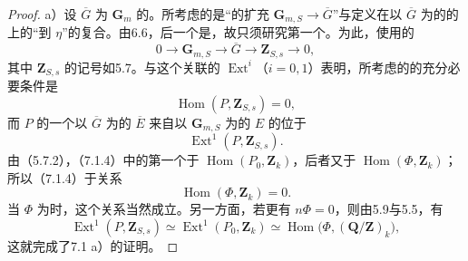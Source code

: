 \begin{proof}
 a）设 $\overline G$ 为 $\mathbf G_m$ 的。所考虑的是“的扩充 $\mathbf G_{m,S}\to\overline G$”与定义在以 $\overline G$ 为的的上的“到 $\eta$”的复合。由6.6，后一个是，故只须研究第一个。为此，使用的
\[
0\longrightarrow\mathbf G_{m,S}\longrightarrow\overline G\longrightarrow\mathbf Z_{S,s}\longrightarrow0,\tag{7.1.3}
\]
其中 $\mathbf Z_{S,s}$ 的记号如5.7。与这个关联的 $\operatorname{Ext}^i$（$i=0,1$）表明，所考虑的的充分必要条件是
\[
\operatorname{Hom}(P,\mathbf Z_{S,s})=0,\tag{7.1.4}
\]
而 $P$ 的一个以 $\overline G$ 为的 $\overline E$ 来自以 $\mathbf G_{m,S}$ 为的 $E$ 的位于
\[
\operatorname{Ext}^1(P,\mathbf Z_{S,s}).\tag{7.1.5}
\]
由（5.7.2），（7.1.4）中的第一个于 $\operatorname{Hom}(P_0,\mathbf Z_k)$，后者又于 $\operatorname{Hom}(\Phi,\mathbf Z_k)$；所以（7.1.4）于关系
\[
\operatorname{Hom}(\Phi,\mathbf Z_k)=0.\tag{7.1.4 bis}
\]
当 $\Phi$ 为时，这个关系当然成立。另一方面，若更有 $n\Phi=0$，则由5.9与5.5，有
\[
\operatorname{Ext}^1(P,\mathbf Z_{S,s})\simeq
\operatorname{Ext}^1(P_0,\mathbf Z_k)\simeq
\operatorname{Hom}\bigl(\Phi,(\mathbf Q/\mathbf Z)_k\bigr),\tag{7.1.6}
\]
这就完成了7.1 a）的证明。


\end{proof}
